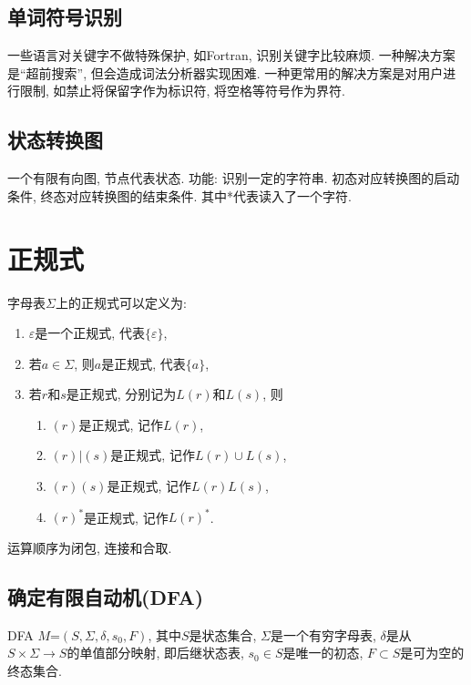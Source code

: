     \subsection{单词符号识别}

        一些语言对关键字不做特殊保护, 如Fortran, 识别关键字比较麻烦. 一种解决方案是``超前搜索'', 但会造成词法分析器实现困难. 一种更常用的解决方案是对用户进行限制, 如禁止将保留字作为标识符, 将空格等符号作为界符.

    \subsection{状态转换图}

        一个有限有向图, 节点代表状态. 功能: 识别一定的字符串. \textsf{初态}对应转换图的启动条件, \textsf{终态}对应转换图的结束条件. 其中*代表读入了一个字符.

\section{正规式}

    字母表$\Sigma$上的正规式可以定义为:

    \begin{enumerate}
        \item $\varepsilon$是一个正规式, 代表$\{\varepsilon\}$,
        \item 若$a\in\Sigma$, 则$a$是正规式, 代表$\{a\}$,
        \item 若$r$和$s$是正规式, 分别记为$L(r)$和$L(s)$, 则
            \begin{enumerate}
                \item $(r)$是正规式, 记作$L(r)$,
                \item $(r)|(s)$是正规式, 记作$L(r)\cup L(s)$,
                \item $(r)(s)$是正规式, 记作$L(r)L(s)$,
                \item $(r)^*$是正规式, 记作$L(r)^*$.
            \end{enumerate}
    \end{enumerate}

    运算顺序为闭包, 连接和合取. 

    \subsection{确定有限自动机(DFA)}

        DFA $M$=$(S,\Sigma,\delta,s_0,F)$, 其中$S$是状态集合, $\Sigma$是一个有穷字母表, $\delta$是从$S\times\Sigma\to S$的单值部分映射, 即后继状态表, $s_0\in S$是唯一的初态, $F\subset S$是可为空的终态集合.

